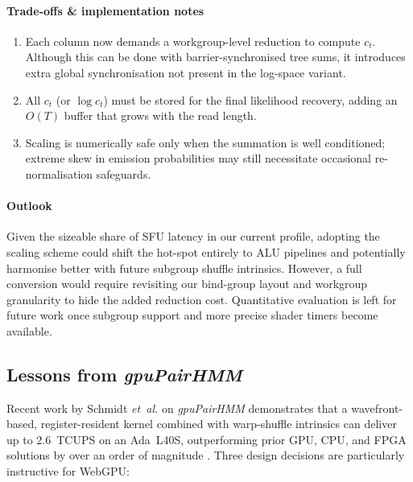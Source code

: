 \documentclass[PhD]{PHlab-thesis}
\begin{document}
\paragraph{Trade-offs \& implementation notes}
\begin{enumerate}
  \item Each column now demands a workgroup-level reduction to compute
        \(c_{t}\). Although this can be done with barrier-synchronised tree
        sums, it introduces extra global synchronisation not present in the
        log-space variant.
  \item All \(c_{t}\) (or \(\log c_{t}\)) must be stored for the final
        likelihood recovery, adding an \(O(T)\) buffer that grows with the
        read length.
  \item Scaling is numerically safe only when the summation is well
        conditioned; extreme skew in emission probabilities may still
        necessitate occasional re-normalisation safeguards.
\end{enumerate}

\paragraph{Outlook}
Given the sizeable share of SFU latency in our current profile, adopting the
scaling scheme could shift the hot-spot entirely to ALU pipelines and
potentially harmonise better with future subgroup shuffle intrinsics.
However, a full conversion would require revisiting our bind-group layout and
workgroup granularity to hide the added reduction cost.
Quantitative evaluation is left for future work once subgroup support and
more precise shader timers become available.



\subsection{Lessons from \textit{gpuPairHMM}}
Recent work by Schmidt \emph{et~al.} on \textit{gpuPairHMM} demonstrates that a wavefront-based, register-resident kernel combined with warp-shuffle intrinsics can deliver up to 2.6~TCUPS on an Ada~L40S, outperforming prior GPU, CPU, and FPGA solutions by over an order of magnitude \cite{Schmidt2024gpuPairHMM}. Three design decisions are particularly instructive for WebGPU:
\end{document}
